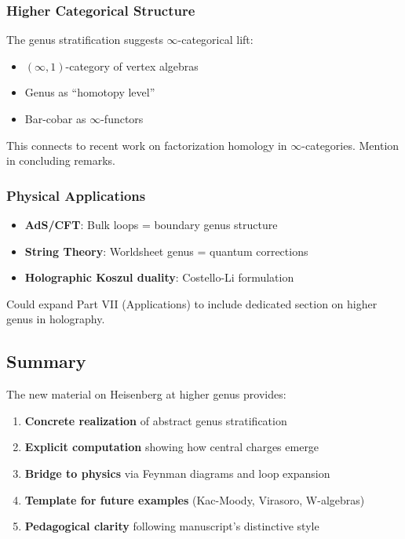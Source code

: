 \subsubsection{Higher Categorical Structure}

The genus stratification suggests $\infty$-categorical lift:
\begin{itemize}
\item $(\infty, 1)$-category of vertex algebras
\item Genus as ``homotopy level''
\item Bar-cobar as $\infty$-functors
\end{itemize}

This connects to recent work on factorization homology in $\infty$-categories. Mention in concluding remarks.

\subsubsection{Physical Applications}

\begin{itemize}
\item \textbf{AdS/CFT}: Bulk loops = boundary genus structure
\item \textbf{String Theory}: Worldsheet genus = quantum corrections
\item \textbf{Holographic Koszul duality}: Costello-Li formulation
\end{itemize}

Could expand Part VII (Applications) to include dedicated section on higher genus in holography.

\subsection{Summary}

The new material on Heisenberg at higher genus provides:

\begin{enumerate}
\item \textbf{Concrete realization} of abstract genus stratification
\item \textbf{Explicit computation} showing how central charges emerge
\item \textbf{Bridge to physics} via Feynman diagrams and loop expansion
\item \textbf{Template for future examples} (Kac-Moody, Virasoro, W-algebras)
\item \textbf{Pedagogical clarity} following manuscript's distinctive style
\end{enumerate}


